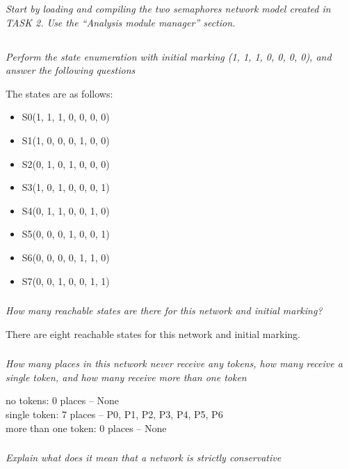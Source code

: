 \documentclass[letterpaper]{article}
\begin{document}
\textit{Start by loading and compiling the two semaphores network model created in TASK 2. Use the “Analysis module manager” section.}

\subsection{}
\textit{Perform the state enumeration with initial marking (1, 1, 1, 0, 0, 0, 0), and answer the following questions}

The states are as follows:
\begin{itemize}
 \item S0(1, 1, 1, 0, 0, 0, 0)
 \item S1(1, 0, 0, 0, 1, 0, 0)
 \item S2(0, 1, 0, 1, 0, 0, 0)
 \item S3(1, 0, 1, 0, 0, 0, 1)
 \item S4(0, 1, 1, 0, 0, 1, 0)
 \item S5(0, 0, 0, 1, 0, 0, 1)
 \item S6(0, 0, 0, 0, 1, 1, 0)
 \item S7(0, 0, 1, 0, 0, 1, 1)
\end{itemize}

\subsubsection{}
\textit{How many reachable states are there for this network and initial marking?}

There are eight reachable states for this network and initial marking.

\subsubsection{}
\textit{How many places in this network never receive any tokens, how many receive a single token, and how many receive more than one token}

no tokens: 0 places -- None\\
single token: 7 places -- P0, P1, P2, P3, P4, P5, P6\\
more than one token: 0 places -- None\\

\subsubsection{}
\textit{Explain what does it mean that a network is strictly conservative}
\end{document}
